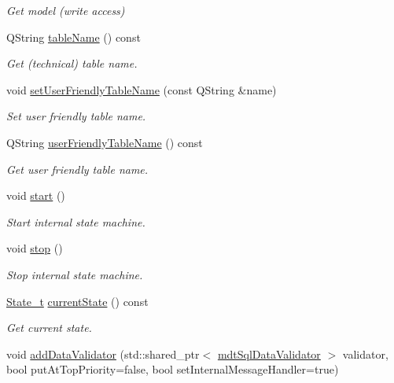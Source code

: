 \begin{DoxyCompactItemize}
\begin{DoxyCompactList}\small\item\em Get model (write access) \end{DoxyCompactList}\item 
Q\-String \hyperlink{classmdt_abstract_sql_table_controller_aaf864d069aeb74068b6daa747b740944}{table\-Name} () const 
\begin{DoxyCompactList}\small\item\em Get (technical) table name. \end{DoxyCompactList}\item 
void \hyperlink{classmdt_abstract_sql_table_controller_acb7f475a3a2d4318e49f86dbaa0dfd9a}{set\-User\-Friendly\-Table\-Name} (const Q\-String \&name)
\begin{DoxyCompactList}\small\item\em Set user friendly table name. \end{DoxyCompactList}\item 
Q\-String \hyperlink{classmdt_abstract_sql_table_controller_a1a9b3d3e4009acd32fc4a083f738fc62}{user\-Friendly\-Table\-Name} () const 
\begin{DoxyCompactList}\small\item\em Get user friendly table name. \end{DoxyCompactList}\item 
void \hyperlink{classmdt_abstract_sql_table_controller_a06b594e9ebed9417ab15edcddaf0f05b}{start} ()
\begin{DoxyCompactList}\small\item\em Start internal state machine. \end{DoxyCompactList}\item 
void \hyperlink{classmdt_abstract_sql_table_controller_a513308d3cce6f8042af28ee882f9d66e}{stop} ()
\begin{DoxyCompactList}\small\item\em Stop internal state machine. \end{DoxyCompactList}\item 
\hyperlink{classmdt_abstract_sql_table_controller_a63536182561f551ccb7616e1786793cd}{State\-\_\-t} \hyperlink{classmdt_abstract_sql_table_controller_adc209887a3bc01243e107614acad5514}{current\-State} () const 
\begin{DoxyCompactList}\small\item\em Get current state. \end{DoxyCompactList}\item 
void \hyperlink{classmdt_abstract_sql_table_controller_a243b633de692a4b51003726ebb292666}{add\-Data\-Validator} (std\-::shared\-\_\-ptr$<$ \hyperlink{classmdt_sql_data_validator}{mdt\-Sql\-Data\-Validator} $>$ validator, bool put\-At\-Top\-Priority=false, bool set\-Internal\-Message\-Handler=true)

\end{DoxyCompactItemize}
